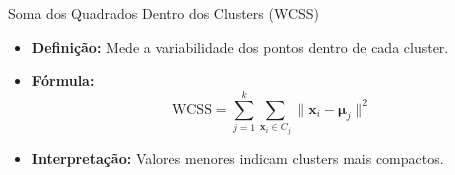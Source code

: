 \documentclass{beamer}
\begin{document}
\begin{frame}{Soma dos Quadrados Dentro dos Clusters (WCSS)}
    \begin{itemize}
        \item \textbf{Definição:} Mede a variabilidade dos pontos dentro de cada cluster.
        \item \textbf{Fórmula:}
        \[
        \text{WCSS} = \sum_{j=1}^{k} \sum_{\mathbf{x}_i \in C_j} \|\mathbf{x}_i - \boldsymbol{\mu}_j\|^2
        \]
        \item \textbf{Interpretação:} Valores menores indicam clusters mais compactos.
    \end{itemize}
    \vspace{0.3cm}
\end{frame}
\end{document}
